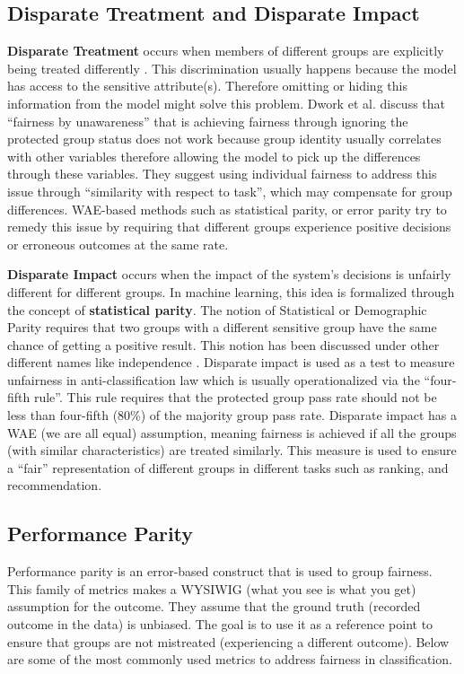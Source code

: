     \subsection{Disparate Treatment and Disparate Impact}
        
        \textbf{Disparate Treatment} occurs when members of different groups are explicitly being treated differently \cite{barocas2016big}. This discrimination usually happens because the model has access to the sensitive attribute(s). Therefore omitting or hiding this information from the model might solve this problem.
        Dwork et al. \cite{Dwork2012individual} discuss that ``fairness by unawareness'' that is achieving fairness through ignoring the protected group status does not work because group identity usually correlates with other variables \cite{Feldman2015} therefore allowing the model to pick up the differences through these variables. They suggest using individual fairness to address this issue through ``similarity with respect to task'', which may compensate for group differences. WAE-based methods such as statistical parity, or error parity try to remedy this issue by requiring that different groups experience positive decisions or erroneous outcomes at the same rate.
        
        \textbf{Disparate Impact} \cite{Feldman2015} occurs when the impact of the system's decisions is unfairly different for different groups. In machine learning, this idea is formalized through the concept of \textbf{statistical parity}. The notion of Statistical or Demographic Parity requires that two groups with a different sensitive group have the same chance of getting a positive result. This notion has been discussed under other different names like independence \cite{barocas2018fairness}. Disparate impact is used as a test to measure unfairness in anti-classification law\cite{corbett2018measure} which is usually operationalized via the ``four-fifth rule''. This rule requires that the protected group pass rate should not be less than four-fifth (80\%) of the majority group pass rate. Disparate impact has a WAE (we are all equal) assumption, meaning fairness is achieved if all the groups (with similar characteristics) are treated similarly. This measure is used to ensure a ``fair'' representation of different groups in different tasks such as ranking\cite{singh2018fairness,zehlike2017fa,yang2017measuring}, and recommendation\cite{mehtora2018towards,ekstrand2018exploring}.
    
    
    \subsection{Performance Parity}
        Performance parity is an error-based construct that is used to group fairness. This family of metrics makes a WYSIWIG (what you see is what you get) assumption for the outcome. They assume that the ground truth (recorded outcome in the data) is unbiased. The goal is to use it as a reference point to ensure that groups are not mistreated (experiencing a different outcome). Below are some of the most commonly used metrics to address fairness in classification.
        

